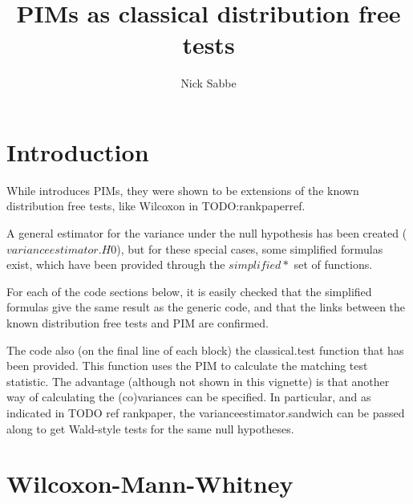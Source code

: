 \documentclass[12pt]{article}
\author{Nick Sabbe}
\begin{document}

\title{PIMs as classical distribution free tests}

\maketitle
\tableofcontents
\section{Introduction}

While \cite{Thas2012} introduces PIMs, they were shown to be extensions of the known distribution free tests, like Wilcoxon in TODO:rankpaperref.

A general estimator for the variance under the null hypothesis has been created ($varianceestimator.H0$), but for these special cases, some simplified formulas exist, which have been provided through the $simplified*$ set of functions.

For each of the code sections below, it is easily checked that the simplified formulas give the same result as the generic code, and that the 
links between the known distribution free tests and PIM are confirmed.

The code also (on the final line of each block) the classical.test function that has been provided. This function uses the PIM to calculate the 
matching test statistic. The advantage (although not shown in this vignette) is that another way of calculating the (co)variances can be specified.
In particular, and as indicated in TODO ref rankpaper, the varianceestimator.sandwich can be passed along to get Wald-style tests for the same
null hypotheses.

\section{Wilcoxon-Mann-Whitney}\label{S_WMW}
\end{document}
